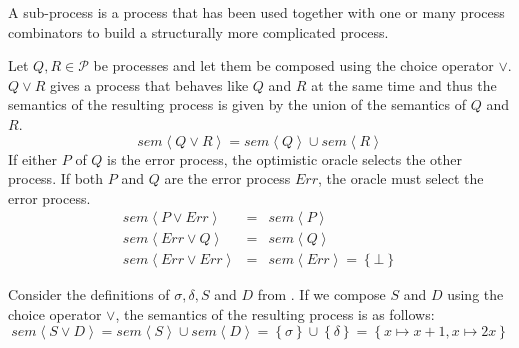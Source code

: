 \begin{definition} 
A sub-process is a process that has been used together with one or many process combinators to build a structurally more complicated process.

\hfill\qedsymbol
\end{definition}

\begin{definition}
\label{def:sem_choice}
Let $Q, R \in \mathcal{P}$ be processes and let them be composed using the choice operator $\vee$. $Q \vee R$ gives a process that behaves like $Q$ and $R$ at the same time and thus the semantics of the resulting process is given by the union of the semantics of $Q$ and $R$.
  \begin{equation}
    \label{eqn:sem_choice}
    sem \left\langle Q \vee R \right\rangle = sem \left\langle Q \right\rangle \cup sem \left\langle R \right\rangle
  \end{equation}
If either $P$ of $Q$ is the error process, the optimistic oracle selects the other process. If both $P$ and $Q$ are the error process $Err$, the oracle must select the error process.
  \begin{eqnarray}
    sem \left\langle P \vee Err \right\rangle & = & sem \left\langle P \right\rangle \\
    sem \left\langle Err \vee Q \right\rangle & = & sem \left\langle Q \right\rangle \\
    sem \left\langle Err \vee Err \right\rangle & = & sem \left\langle Err \right\rangle = \left\{ \bot \right\}
  \end{eqnarray}
  \hfill\qedsymbol
\end{definition}

\begin{example}
\label{exp:sem_chice}
Consider the definitions of $\sigma, \delta, S$ and $D$ from . If we compose $S$ and $D$ using the choice operator $\vee$, the semantics of the resulting process is as follows:
  \begin{equation}
    sem \left\langle S \vee D \right\rangle = sem \left\langle S \right\rangle \cup sem \left\langle D \right\rangle = \left\{ \sigma \right\} \cup \left\{ \delta \right\} = \left\{ x \mapsto x+1, x \mapsto 2x \right\}
  \end{equation}
  \hfill\qedsymbol
\end{example}


